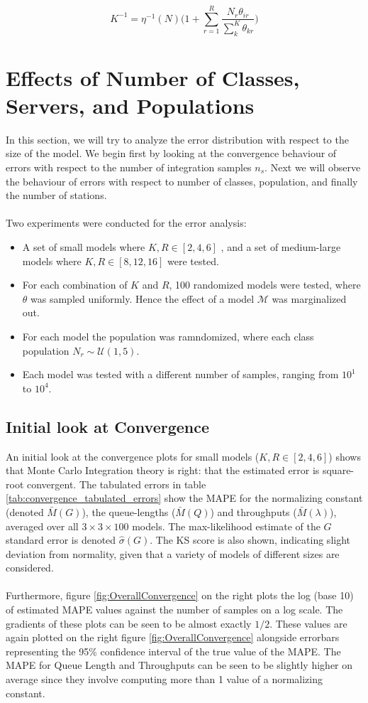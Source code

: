 \[K^{-1} = \eta^{-1}(N) \bigg( 1 + \sum_{r=1}^R \frac{N_r \theta_{ir}}{\sum_k^K \theta_{kr} } \bigg)\]

\section{Effects of Number of Classes, Servers, and Populations}\label{sec:Analyze_K_R_N}
In this section, we will try to analyze the error distribution with respect to the size of the model. We begin first by looking at the convergence behaviour of errors with respect to the number of integration samples \(n_s\). Next we will observe the behaviour of errors with respect to number of classes, population, and finally the number of stations.
\\\\
Two experiments were conducted for the error analysis: 
\begin{itemize}[noitemsep]
    \item A set of small models where \(K,R \in [2,4,6]\) , and a set of medium-large models where \(K,R \in [8,12,16]\) were tested.
    \item For each combination of \(K\) and \(R\), 100 randomized models were tested, where \(\theta\) was sampled uniformly. Hence the effect of a model \(\mathcal{M}\) was marginalized out.
    \item For each model the population was ramndomized, where each class population \(N_r \sim \mathcal{U}(1,5)\). 
    \item Each model was tested with a different number of samples, ranging from \(10^1\) to \(10^4\).
\end{itemize}

\subsection{Initial look at Convergence}
An initial look at the convergence plots for small models (\(K,R \in [2,4,6]\)) shows that Monte Carlo Integration theory is right: that the estimated error is square-root convergent. The tabulated errors in table \ref{tab:convergence_tabulated_errors} show the MAPE for the normalizing constant (denoted \(\bar{M}(G)\)), the queue-lengths (\(\bar{M}(Q)\)) and throughputs (\(\bar{M}(\lambda)\)), averaged over all \(3 \times 3 \times 100\) models. The max-likelihood estimate of the \(G\) standard error is denoted \(\hat{\sigma}(G)\). The KS score is also shown, indicating slight deviation from normality, given that a variety of models of different sizes are considered.
\\\\
Furthermore, figure \ref{fig:OverallConvergence} on the right plots the log (base 10) of estimated MAPE values against the number of samples on a log scale. The gradients of these plots can be seen to be almost exactly \(1/2\). These values are again plotted on the right figure \ref{fig:OverallConvergence} alongside errorbars representing the 95\% confidence interval of the true value of the MAPE. The MAPE for Queue Length and Throughputs can be seen to be slightly higher on average since they involve computing more than 1 value of a normalizing constant.

